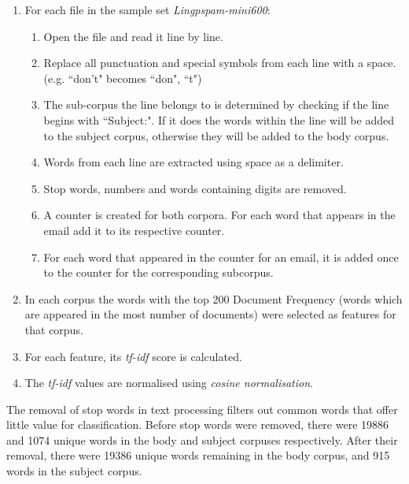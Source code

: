\documentclass[10pt, a4paper]{article}
\begin{document}
\begin{enumerate}
\item For each file in the sample set \emph{Lingpspam-mini600}:
	\begin{enumerate}[label*=\arabic*.]
	\item Open the file and read it line by line.
	\item Replace all punctuation and special symbols from each line with a space. (e.g. ``don't" becomes ``don", ``t")
	\item The sub-corpus the line belongs to is determined by checking if the line begins with ``Subject:". If it does the words within the line will be added to the subject corpus, otherwise they will be added to the body corpus.
	\item Words from each line are extracted using space as a delimiter.
	\item Stop words, numbers and words containing digits are removed.
	\item A counter is created for both corpora. For each word that appears in the email add it to its respective counter.
	\item For each word that appeared in the counter for an email, it is added once to the counter for the corresponding subcorpus.
	\end{enumerate}
\item In each corpus the words with the top 200 Document Frequency (words which are appeared in the most number of documents) were selected as features for that corpus.
\item For each feature, its \emph{tf-idf} score is calculated.
\item The \emph{tf-idf} values are normalised using \emph{cosine normalisation}.
\end{enumerate}


The removal of stop words in text processing filters out common words that offer little value for classification. Before stop words were removed, there were 19886 and 1074 unique words in the body and subject corpuses respectively. After their removal, there were 19386 unique words remaining in the body corpus, and 915 words in the subject corpus.
\end{document}

